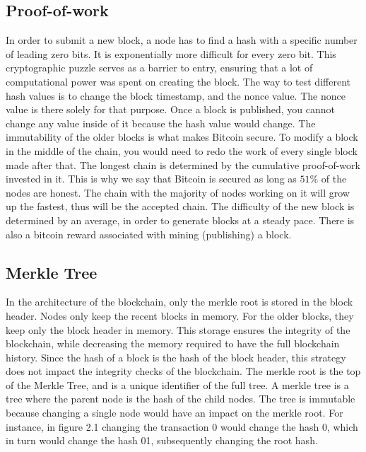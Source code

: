 \subsection{Proof-of-work}
In order to submit a new block, a node has to find a hash with a specific number of leading zero bits.
It is exponentially more difficult for every zero bit.
This cryptographic puzzle serves as a barrier to entry, ensuring that a lot of computational power was spent on creating the block.
The way to test different hash values is to change the block timestamp, and the nonce value.
The nonce value is there solely for that purpose. Once a block is published, you cannot change any value inside of it because the hash value would change.
The immutability of the older blocks is what makes Bitcoin secure. To modify a block in the middle of the chain, you would need to redo the work of every single block made after that.
The longest chain is determined by the cumulative proof-of-work invested in it. This is why we say that Bitcoin is secured as long as $51\%$  of the nodes are honest.
The chain with the majority of nodes working on it will grow up the fastest, thus will be the accepted chain.
The difficulty of the new block is determined by an average, in order to generate blocks at a steady pace. There is also a bitcoin reward associated with mining (publishing) a block.






\subsection{Merkle Tree}
In the architecture of the blockchain, only the merkle root is stored in the block header. Nodes only keep the recent blocks in memory. For the older blocks, they keep only the block header in memory.
This storage ensures the integrity of the blockchain, while decreasing the memory required to have the full blockchain history.
Since the hash of a block is the hash of the block header, this strategy does not impact the integrity checks of the blockchain.
The merkle root is the top of the Merkle Tree, and is a unique identifier of the full tree. A merkle tree is a tree where the parent node is the hash of the child nodes.
The tree is immutable because changing a single node would have an impact on the merkle root. For instance, in figure 2.1 changing the transaction 0 would change the hash 0,
which in turn would change the hash 01, subsequently changing the root hash.


